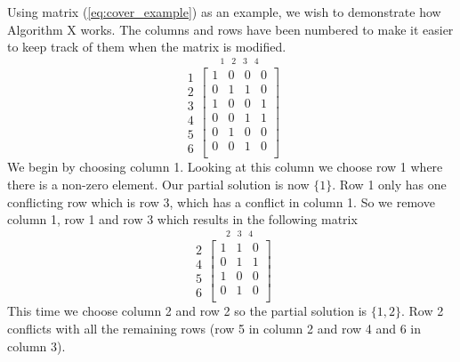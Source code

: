 Using matrix (\ref{eq:cover_example}) as an example, we wish to demonstrate how Algorithm X works.
The columns and rows have been numbered to make it easier to keep track of them when the matrix is modified.
\begin{equation}
	\label{eq:ces1}
	\begin{array}{r} 1\\ 2\\ 3\\ 4\\ 5\\ 6 \end{array}
	\stackrel{
		\begin{array}{cccc} 1 & 2 & 3 & 4 \end{array}
	}{
		\begin{bmatrix}
			1 & 0 & 0 & 0 \\
			0 & 1 & 1 & 0 \\
			1 & 0 & 0 & 1 \\
			0 & 0 & 1 & 1 \\
			0 & 1 & 0 & 0 \\
			0 & 0 & 1 & 0 \\
		\end{bmatrix}
	}
\end{equation}
We begin by choosing column 1.
Looking at this column we choose row 1 where there is a non-zero element.
Our partial solution is now $\{ 1 \}$.
Row 1 only has one conflicting row which is row 3, which has a conflict in column 1.
So we remove column 1, row 1 and row 3 which results in the following matrix
\begin{equation}
	\label{eq:ces2}
	\begin{array}{r} 2\\ 4\\ 5\\ 6 \end{array}
	\stackrel{
		\begin{array}{ccc} 2 & 3 & 4 \end{array}
	}{
		\begin{bmatrix}
			1 & 1 & 0 \\
			0 & 1 & 1 \\
			1 & 0 & 0 \\
			0 & 1 & 0 \\
		\end{bmatrix}
	}
\end{equation}
This time we choose column 2 and row 2 so the partial solution is $\{ 1, 2 \}$.
Row 2 conflicts with all the remaining rows (row 5 in column 2 and row 4 and 6 in column 3).
